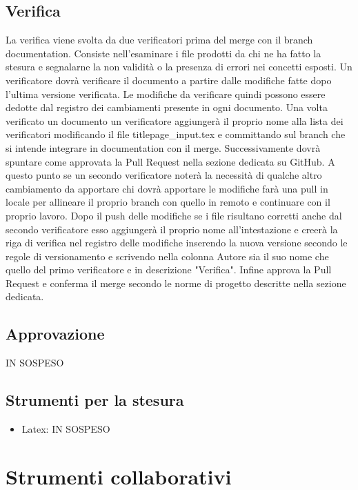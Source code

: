 \subsection{Verifica}
La verifica viene svolta da due verificatori prima del merge con il branch documentation.
Consiste nell'esaminare i file prodotti da chi ne ha fatto la stesura e segnalarne la non validità o 
la presenza di errori nei concetti esposti.
Un verificatore dovrà verificare il documento a partire dalle modifiche fatte dopo l'ultima versione verificata.
Le modifiche da verificare quindi possono essere dedotte dal registro dei cambiamenti presente in ogni documento.
Una volta verificato un documento un verificatore aggiungerà il proprio nome alla lista dei verificatori 
modificando il file titlepage\_input.tex e committando sul branch che si intende integrare in documentation con il merge.
Successivamente dovrà spuntare come approvata la Pull Request nella sezione dedicata su GitHub. 
A questo punto se un secondo verificatore noterà la necessità di qualche altro cambiamento da apportare chi dovrà apportare le modifiche farà una pull in locale per
allineare il proprio branch con quello in remoto e continuare con il proprio lavoro.
Dopo il push delle modifiche se i file risultano corretti anche dal secondo verificatore esso aggiungerà il proprio nome all'intestazione e creerà la riga di verifica
nel registro delle modifiche inserendo la nuova versione secondo le regole di versionamento e scrivendo nella colonna Autore sia il suo nome
che quello del primo verificatore e in descrizione "Verifica".
Infine approva la Pull Request e conferma il merge secondo le norme di progetto descritte nella sezione dedicata.

\subsection{Approvazione}
IN SOSPESO
\subsection{Strumenti per la stesura}
\begin{itemize} 
    \item Latex: IN SOSPESO
\end{itemize}

\section{Strumenti collaborativi}
